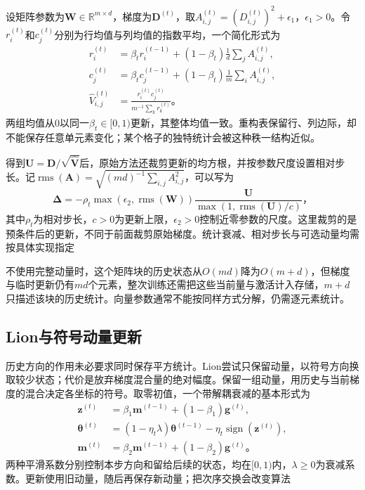 设矩阵参数为$\bm W\in\mathbb R^{m\times d}$，梯度为$\bm D^{(t)}$，取$A_{i,j}^{(t)}=(D_{i,j}^{(t)})^2+\epsilon_1$，$\epsilon_1>0$。令$r_i^{(t)}$和$c_j^{(t)}$分别为行均值与列均值的指数平均，一个简化形式为
\begin{align}
  r_i^{(t)}&=\beta_t r_i^{(t-1)}+(1-\beta_t)\frac1d\sum_j A_{i,j}^{(t)},\\
  c_j^{(t)}&=\beta_t c_j^{(t-1)}+(1-\beta_t)\frac1m\sum_i A_{i,j}^{(t)},\\
  \hat V_{i,j}^{(t)}&=\frac{r_i^{(t)}c_j^{(t)}}{m^{-1}\sum_k r_k^{(t)}}\text{。}
  \label{eq:training-adafactor-factorization}
\end{align}
两组均值从0以同一$\beta_t\in[0,1)$更新，其整体均值一致。重构表保留行、列边际，却不能保存任意单元素变化；某个格子的独特统计会被这种秩一结构近似。

得到$\bm U=\bm D/\sqrt{\hat{\bm V}}$后，原始方法还裁剪更新的均方根，并按参数尺度设置相对步长。记$\operatorname{rms}(\bm A)=\sqrt{(md)^{-1}\sum_{i,j}A_{i,j}^2}$，可以写为
\begin{equation}
  \bm\Delta=-\rho_t\max(\epsilon_2,\operatorname{rms}(\bm W))
    \frac{\bm U}{\max(1,\operatorname{rms}(\bm U)/c)}\text{，}
  \label{eq:training-adafactor-update}
\end{equation}
其中$\rho_t$为相对步长，$c>0$为更新上限，$\epsilon_2>0$控制近零参数的尺度。这里裁剪的是预条件后的更新，不同于前面裁剪原始梯度。统计衰减、相对步长与可选动量均需按具体实现指定

不使用完整动量时，这个矩阵块的历史状态从$O(md)$降为$O(m+d)$，但梯度与临时更新仍有$md$个元素，整次训练还需把这些当前量与激活计入存储，$m+d$只描述该块的历史统计。向量参数通常不能按同样方式分解，仍需逐元素统计。

\subsection{Lion与符号动量更新}
\label{sec:training-lion}

历史方向的作用未必要求同时保存平方统计。Lion尝试只保留动量，以符号方向换取较少状态；代价是放弃梯度混合量的绝对幅度。保留一组动量，用历史与当前梯度的混合决定各坐标的符号。取零初值，一个带解耦衰减的基本形式为
\begin{align}
  \bm z^{(t)}&=\beta_1\bm m^{(t-1)}+(1-\beta_1)\bm g^{(t)},\\
  \bm\theta^{(t)}&=(1-\eta_t\lambda)\bm\theta^{(t-1)}
      -\eta_t\operatorname{sign}(\bm z^{(t)}),\\
  \bm m^{(t)}&=\beta_2\bm m^{(t-1)}+(1-\beta_2)\bm g^{(t)}\text{。}
  \label{eq:training-lion}
\end{align}
两种平滑系数分别控制本步方向和留给后续的状态，均在$[0,1)$内，$\lambda\geq0$为衰减系数。更新使用旧动量，随后再保存新动量；把次序交换会改变算法

